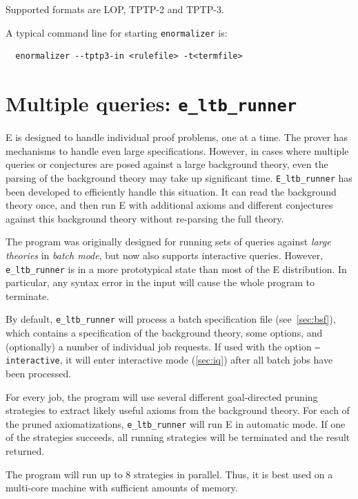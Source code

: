 \documentclass{report}
\begin{document}
Supported formats are LOP, TPTP-2 and TPTP-3.

A typical command line for starting \texttt{enormalizer} is:

\begin{verbatim}
  enormalizer --tptp3-in <rulefile> -t<termfile>
\end{verbatim}


\section{Multiple queries: \texttt{e\_ltb\_runner}}

E is designed to handle individual proof problems, one at a time. The
prover has mechanisms to handle even large specifications. However, in
cases where multiple queries or conjectures are posed against a large
background theory, even the parsing of the background theory may take
up significant time. \texttt{E\_ltb\_runner} has been developed to
efficiently handle this situation. It can read the background theory
once, and then run E with additional axioms and different conjectures
against this background theory without re-parsing the full theory.

The program was originally designed for running sets of queries
against \emph{large theories} in \emph{batch mode}, but now also
supports interactive queries. However, \texttt{e\_ltb\_runner} is in a
more prototypical state than most of the E distribution. In
particular, any syntax error in the input will cause the whole program
to terminate.

By default, \texttt{e\_ltb\_runner} will process a batch specification
file (see~\ref{sec:bsf}), which contains a specification of the
background theory, some options, and (optionally) a number of
individual job requests. If used with the option
\texttt{--interactive}, it will enter interactive mode (\ref{sec:iq})
after all batch jobs have been processed.

For every job, the program will use several different goal-directed
pruning strategies to extract likely useful axioms from the background
theory. For each of the pruned axiomatizations,
\texttt{e\_ltb\_runner} will run E in automatic mode. If one of the
strategies succeeds, all running strategies will be terminated and the
result returned.

The program will run up to 8 strategies in parallel. Thus, it is best
used on a multi-core machine with sufficient amounts of memory.
\end{document}
